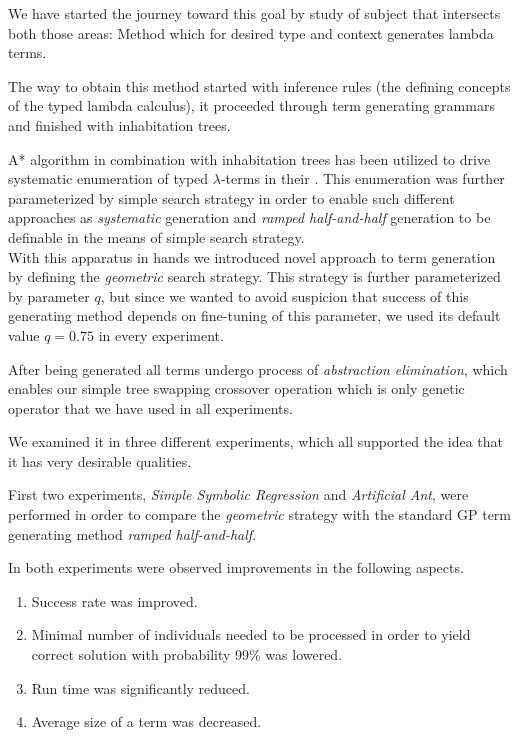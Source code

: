 \documentclass[12pt,a4paper]{report}
\newcommand{\lterms}{$\lambda$-terms\xspace}
\begin{document}
We have started the journey toward this goal by study 
of subject that intersects both those areas:
Method which for desired type and context generates lambda terms.  

The way to obtain this method started with inference rules 
(the defining concepts of the typed lambda calculus),
it proceeded through term generating grammars and finished 
with inhabitation trees.

A* algorithm in combination with inhabitation trees
has been utilized to drive systematic enumeration
of typed \lterms in their \lnf. This enumeration was further 
parameterized by simple search strategy in order to enable
such different approaches as \textit{systematic} generation 
and \textit{ramped half-and-half} generation to be definable
in the means of simple search strategy.\\

With this apparatus in hands we introduced novel approach
to term generation by defining the \textit{geometric} search 
strategy. This strategy is further parameterized by parameter
$q$,  but since we wanted to avoid suspicion that success
of this generating method depends on fine-tuning of this
parameter, we used its default value $q = 0.75$ in every experiment.

After being generated all terms undergo process of \textit{abstraction
elimination}, which enables our simple tree swapping crossover operation
which is only genetic operator that we have used in all experiments.

We examined it in three different experiments, which all 
supported the idea that it has very desirable qualities.

First two experiments, \textit{Simple Symbolic Regression} and 
\textit{Artificial Ant}, were performed in order to compare
the \textit{geometric} strategy with the standard GP term 
generating method \textit{ramped half-and-half}. 

In both experiments were observed improvements in the following aspects.

\begin{enumerate}
 \item Success rate was improved.
 \item Minimal number of individuals needed to be processed in order to yield 
       correct solution with probability 99\% was lowered.
 \item Run time was significantly reduced. 
 \item Average size of a term was decreased.
\end{enumerate}
\end{document}
